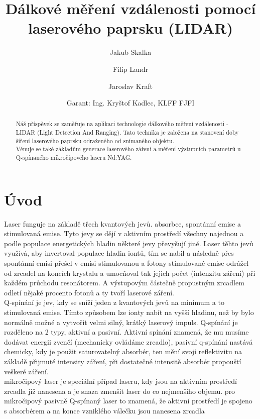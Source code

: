 \documentclass[12pt,a4paper]{article}
\title{Dálkové měření vzdálenosti pomocí laserového paprsku (LIDAR)}
\author[1]{Jakub Skalka}
\author[2]{Filip Landr}
\author[3]{Jaroslav Kraft}
\date{\small Garant: Ing. Kryštof Kadlec, KLFF FJFI\vspace{-2em}} %
\affil[1]{Gymnázium, České Budějovice, Jírovcova 8; skalkaj@jirovcovka.net}
\affil[2]{Gymnázium, Praha 5, Nad Kavalírkou 100/1; fi.landr@seznam.cz}
\affil[3]{Gymnázium, Příbram, Legionářů 402; kraft.jarda@gmail.com\vspace{-1em}} %
\begin{document}
\maketitle \thispagestyle{empty}

\begin{abstract} \noindent
    Náš příspěvek se zaměřuje na aplikaci technologie dálkového měření vzdálenosti - LIDAR (Light Detection And Ranging). Tato technika je založena na stanovení doby šíření laserového paprsku odraženého od snímaného objektu. \\Věnuje se také základům generace laserového záření a měření výstupních parametrů u Q-spínaného mikročipového laseru Nd:YAG.\end{abstract}


\section{Úvod}
Laser funguje na základě třech kvantových jevů. absorbce, spontánní emise a stimulovaná emise. Tyto jevy se dějí v aktivním prostředí všechny najednou a podle populace energetických hladin některé jevy převyšují jiné. Laser těhto jevů využívá, aby invertoval populace hladin iontů, tím se nabil a následně přes spontánní emisi přešel v emisi stimulovanou a fotony stimulované emise odrážel od zrcadel na koncích krystalu a umocňoval tak jejich počet (intenzitu zářeni) při každém průchodu resonátorem. A výstupovým částečně propustným zrcadlem odletí nějaké procento fotonů a ty tvoří laserové záření.
\\Q-spínání je jev, kdy se sníží jeden z kvantových jevů na minimum a to stimulovaná emise. Tímto způsobem lze ionty nabít na vyšší hladinu, než by bylo normálně možné a vytvořit velmi silný, krátký laserový impuls. Q-spínání je rozděleno na 2 typy, aktivní a pasivní. Aktivní spínání znamená, že mu musíme dodávat energii zvenčí (mechanicky ovládáme zrcadlo), pasivní q-spínání nastává chemicky, kdy je použit saturovatelný absorbér, ten mění svojí reflektivitu na základě přijmuté intensity záření, při dostatečné intensitě absorbér propouští veškeré záření.
\\mikročipový laser je speciální případ laseru, kdy jsou na aktivním prostředí zrcadla již nanesena a je snaza zmenšit laser do co nejmenšího objemu. pro mikročipový pasivně Q-spínaný laser to znamená, že aktivní prostředí je spojeno s absorbérem a na konce vzniklého válečku jsou nanesena zrcadla
\end{document}
